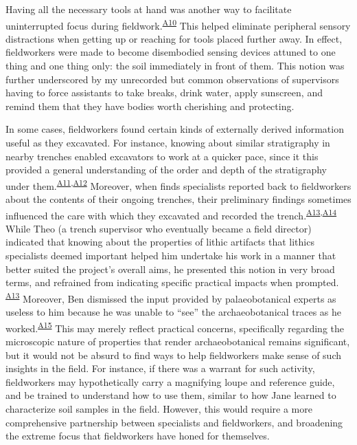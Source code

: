 \documentclass[
]{article}
\begin{document}
Having all the necessary tools at hand was another way to facilitate
uninterrupted focus during
fieldwork.\textsuperscript{\hyperref[sec-A10]{A10}} This helped
eliminate peripheral sensory distractions when getting up or reaching
for tools placed further away. In effect, fieldworkers were made to
become disembodied sensing devices attuned to one thing and one thing
only: the soil immediately in front of them. This notion was further
underscored by my unrecorded but common observations of supervisors
having to force assistants to take breaks, drink water, apply sunscreen,
and remind them that they have bodies worth cherishing and protecting.

In some cases, fieldworkers found certain kinds of externally derived
information useful as they excavated. For instance, knowing about
similar stratigraphy in nearby trenches enabled excavators to work at a
quicker pace, since it this provided a general understanding of the
order and depth of the stratigraphy under
them.\textsuperscript{\hyperref[sec-A11]{A11},\hyperref[sec-A12]{A12}}
Moreover, when finds specialists reported back to fieldworkers about the
contents of their ongoing trenches, their preliminary findings sometimes
influenced the care with which they excavated and recorded the
trench.\textsuperscript{\hyperref[sec-A13]{A13},\hyperref[sec-A14]{A14}}
While Theo (a trench supervisor who eventually became a field director)
indicated that knowing about the properties of lithic artifacts that
lithics specialists deemed important helped him undertake his work in a
manner that better suited the project's overall aims, he presented this
notion in very broad terms, and refrained from indicating specific
practical impacts when prompted.
\textsuperscript{\hyperref[sec-A13]{A13}} Moreover, Ben dismissed the
input provided by palaeobotanical experts as useless to him because he
was unable to ``see'' the archaeobotanical traces as he
worked.\textsuperscript{\hyperref[sec-A15]{A15}} This may merely reflect
practical concerns, specifically regarding the microscopic nature of
properties that render archaeobotanical remains significant, but it
would not be absurd to find ways to help fieldworkers make sense of such
insights in the field. For instance, if there was a warrant for such
activity, fieldworkers may hypothetically carry a magnifying loupe and
reference guide, and be trained to understand how to use them, similar
to how Jane learned to characterize soil samples in the field. However,
this would require a more comprehensive partnership between specialists
and fieldworkers, and broadening the extreme focus that fieldworkers
have honed for themselves.
\end{document}
